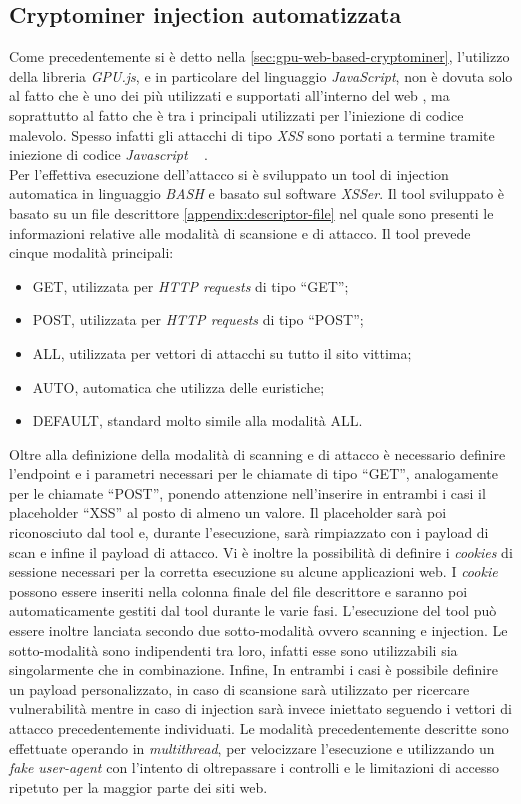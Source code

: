 \documentclass[conference, italian]{IEEEtran}
\newcommand\citen[1]{\citeauthor{#1} \citep{#1}}
\begin{document}
\subsection{Cryptominer injection automatizzata}\label{sec:cryptominer-automatic-injection}
Come precedentemente si è detto nella \cref{sec:gpu-web-based-cryptominer}, l'utilizzo della libreria \emph{GPU.js}, e in particolare del linguaggio \emph{JavaScript}, non è dovuta solo al fatto che è uno dei più utilizzati e supportati all'interno del web \citep{w3techsJavascriptPopularity}, ma soprattutto al fatto che è tra i principali utilizzati per l'iniezione di codice malevolo. Spesso infatti gli attacchi di tipo \emph{XSS} sono portati a termine tramite iniezione di codice \emph{Javascript} ~\citen{owaspxss}.\\
Per l'effettiva esecuzione dell'attacco si è sviluppato un tool di injection automatica in linguaggio \emph{BASH} e basato sul software \emph{XSSer}. Il tool sviluppato è basato su un file descrittore \cref{appendix:descriptor-file} nel quale sono presenti le informazioni relative alle modalità di scansione e di attacco. Il tool prevede cinque modalità principali:
\begin{itemize}
  \item GET, utilizzata per \emph{HTTP requests} di tipo ``GET'';\@
  \item POST, utilizzata per \emph{HTTP requests} di tipo ``POST'';\@
  \item ALL, utilizzata per vettori di attacchi su tutto il sito vittima;
  \item AUTO, automatica che utilizza delle euristiche;
  \item DEFAULT, standard molto simile alla modalità ALL.\@
\end{itemize}
Oltre alla definizione della modalità di scanning e di attacco è necessario definire l'endpoint e i parametri necessari per le chiamate di tipo ``GET'', analogamente per le chiamate ``POST'', ponendo attenzione nell'inserire in entrambi i casi il placeholder ``XSS'' al posto di almeno un valore. Il placeholder sarà poi riconosciuto dal tool e, durante l'esecuzione, sarà rimpiazzato con i payload di scan e infine il payload di attacco. Vi è inoltre la possibilità di definire i \emph{cookies} di sessione necessari per la corretta esecuzione su alcune applicazioni web. I \emph{cookie} possono essere inseriti nella colonna finale del file descrittore e saranno poi automaticamente gestiti dal tool durante le varie fasi.
L'esecuzione del tool può essere inoltre lanciata secondo due sotto-modalità ovvero scanning e injection. Le sotto-modalità sono indipendenti tra loro, infatti esse sono utilizzabili sia singolarmente che in combinazione. Infine, In entrambi i casi è possibile definire un payload personalizzato, in caso di scansione sarà utilizzato per ricercare vulnerabilità mentre in caso di injection sarà invece iniettato seguendo i vettori di attacco precedentemente individuati. Le modalità precedentemente descritte sono effettuate operando in \emph{multithread}, per velocizzare l'esecuzione e utilizzando un \emph{fake user-agent} con l'intento di oltrepassare i controlli e le limitazioni di accesso ripetuto per la maggior parte dei siti web.\\
\end{document}
